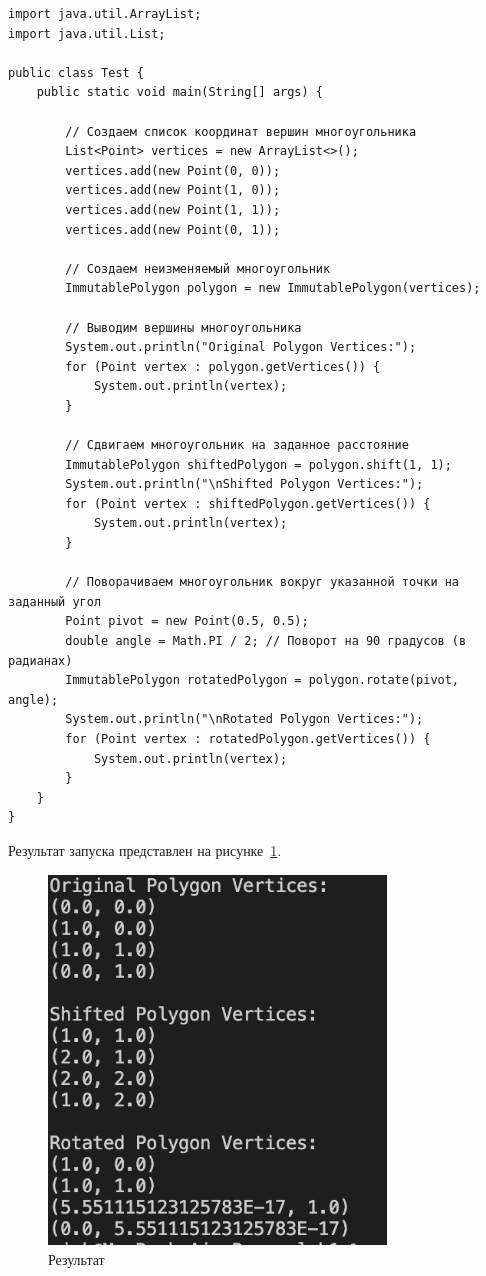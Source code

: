 \documentclass[a4paper, 14pt]{extarticle}
\begin{document}
\begin{lstlisting}[language={},caption={класс Test},label={lst:code3}]
import java.util.ArrayList;
import java.util.List;

public class Test {
    public static void main(String[] args) {

        // Создаем список координат вершин многоугольника
        List<Point> vertices = new ArrayList<>();
        vertices.add(new Point(0, 0));
        vertices.add(new Point(1, 0));
        vertices.add(new Point(1, 1));
        vertices.add(new Point(0, 1));

        // Создаем неизменяемый многоугольник
        ImmutablePolygon polygon = new ImmutablePolygon(vertices);

        // Выводим вершины многоугольника
        System.out.println("Original Polygon Vertices:");
        for (Point vertex : polygon.getVertices()) {
            System.out.println(vertex);
        }

        // Сдвигаем многоугольник на заданное расстояние
        ImmutablePolygon shiftedPolygon = polygon.shift(1, 1);
        System.out.println("\nShifted Polygon Vertices:");
        for (Point vertex : shiftedPolygon.getVertices()) {
            System.out.println(vertex);
        }

        // Поворачиваем многоугольник вокруг указанной точки на заданный угол
        Point pivot = new Point(0.5, 0.5);
        double angle = Math.PI / 2; // Поворот на 90 градусов (в радианах)
        ImmutablePolygon rotatedPolygon = polygon.rotate(pivot, angle);
        System.out.println("\nRotated Polygon Vertices:");
        for (Point vertex : rotatedPolygon.getVertices()) {
            System.out.println(vertex);
        }
    }
} 
\end{lstlisting}

Результат запуска представлен на рисунке~\ref{fig:lab2}.

\begin{figure}[!htb]
    \centering
    \includegraphics[width=0.8\textwidth]{lab2}
    \caption{Результат}
    \label{fig:lab2}
\end{figure}
\end{document}
